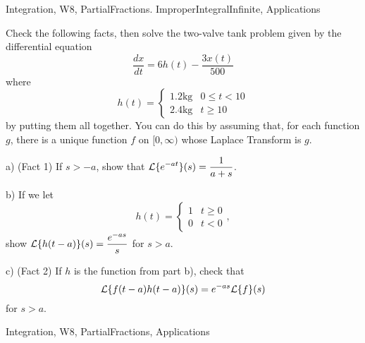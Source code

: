 \begin{tagblock}{Integration, W8, PartialFractions. ImproperIntegralInfinite, Applications}
\begin{question}
Check the following facts, then solve the two-valve tank problem given by the differential equation
\begin{equation}\label{brine}
\frac{dx}{dt}=6h(t)-\frac{3x(t)}{500}
\end{equation}
where
\[
h(t)=\begin{cases} 1.2\textrm{kg} & 0\leq t<10 \\ 2.4\textrm{kg} & t\geq 10 \end{cases}
\] 
by putting them all together. You can do this by assuming that, for each function $g$, there is a unique function $f$ on $[0,\infty)$ whose Laplace Transform is $g$. 

\bigskip

a) (Fact 1) If $s>-a$, show that $\displaystyle\mathcal{L}\{e^{-at}\}(s)=\frac 1 {a+s}$. 

\bigskip

b) If we let
\[
h(t)=\begin{cases} 1 & t\geq 0 \\ 0 & t<0\end{cases},
\]
show $\displaystyle\mathcal{L}\{h(t-a)\}(s)=\frac {e^{-as}} s$ for $s>a$. 

\bigskip

c) (Fact 2) If $h$ is the function from part b), check that 
\[
\mathcal{L}\{f(t-a)h(t-a)\}(s)=e^{-as}\mathcal{L}\{f\}(s)
\]
for $s>a$. 

\bigskip
	
	
\begin{tags}
	   Integration, W8, PartialFractions, Applications
\end{tags}
	
\begin{diary}
\end{diary}
	
\begin{solution}
	   
	    \end{enumerate}
\end{solution}
	
\end{question}

\end{tagblock}

